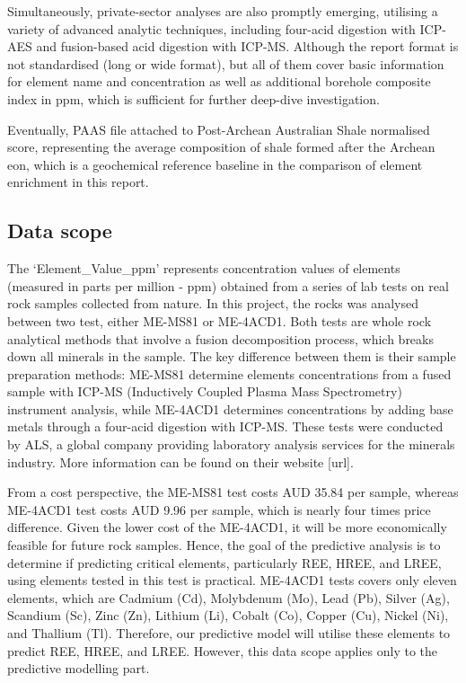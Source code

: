 \documentclass[11pt,a4paper,]{article}
\begin{document}
Simultaneously, private-sector analyses are also promptly emerging, utilising a variety of advanced analytic techniques, including four-acid digestion with ICP-AES and fusion-based acid digestion with ICP-MS. Although the report format is not standardised (long or wide format), but all of them cover basic information for element name and concentration as well as additional borehole composite index in ppm, which is sufficient for further deep-dive investigation.

Eventually, PAAS file attached to \autocite{McLennan2011} Post-Archean Australian Shale normalised score, representing the average composition of shale formed after the Archean eon, which is a geochemical reference baseline in the comparison of element enrichment in this report.

\subsection{Data scope}\label{data-scope}

The `Element\_Value\_ppm' represents concentration values of elements (measured in parts per million - ppm) obtained from a series of lab tests on real rock samples collected from nature. In this project, the rocks was analysed between two test, either ME-MS81 or ME-4ACD1. Both tests are whole rock analytical methods that involve a fusion decomposition process, which breaks down all minerals in the sample. The key difference between them is their sample preparation methods: ME-MS81 determine elements concentrations from a fused sample with ICP-MS (Inductively Coupled Plasma Mass Spectrometry) instrument analysis, while ME-4ACD1 determines concentrations by adding base metals through a four-acid digestion with ICP-MS. These tests were conducted by ALS, a global company providing laboratory analysis services for the minerals industry. More information can be found on their website {[}url{]}.

From a cost perspective, the ME-MS81 test costs AUD 35.84 per sample, whereas ME-4ACD1 test costs AUD 9.96 per sample, which is nearly four times price difference. Given the lower cost of the ME-4ACD1, it will be more economically feasible for future rock samples. Hence, the goal of the predictive analysis is to determine if predicting critical elements, particularly REE, HREE, and LREE, using elements tested in this test is practical. ME-4ACD1 tests covers only eleven elements, which are Cadmium (Cd), Molybdenum (Mo), Lead (Pb), Silver (Ag), Scandium (Sc), Zinc (Zn), Lithium (Li), Cobalt (Co), Copper (Cu), Nickel (Ni), and Thallium (Tl). Therefore, our predictive model will utilise these elements to predict REE, HREE, and LREE. However, this data scope applies only to the predictive modelling part.
\end{document}
